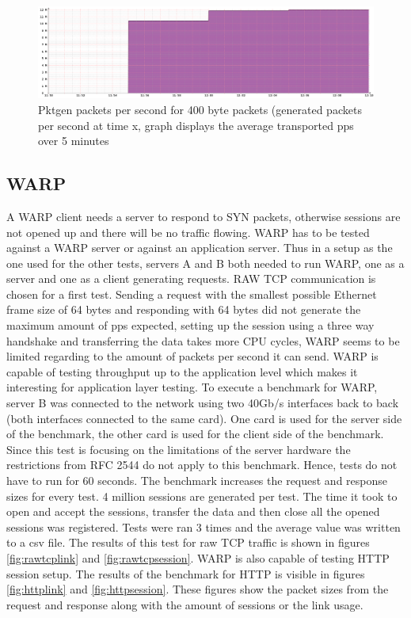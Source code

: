 \begin{figure}
  \includegraphics[scale=0.35]{images/pktgen_pps.png}
  \caption{Pktgen packets per second for 400 byte packets (generated packets per second at time x, graph displays the average transported pps over 5 minutes}
  \label{fig:pktgenpps}
\end{figure}

\newpage

\subsection{WARP}\label{sub:warp}
A WARP client needs a server to respond to SYN packets, otherwise sessions are not opened up and there will be no traffic flowing. 
WARP has to be tested against a WARP server or against an application server. 
Thus in a setup as the one used for the other tests, servers A and B both needed to run WARP, one as a server and one as a client generating requests. RAW TCP communication is chosen for a first test. 
Sending a request with the smallest possible Ethernet frame size of 64 bytes and responding with 64 bytes did not generate the maximum amount of pps expected, setting up the session using a three way handshake and transferring the data takes more CPU cycles, WARP seems to be limited regarding to the amount of packets per second it can send. WARP is capable of testing throughput up to the application level which makes it interesting for application layer testing.
To execute a benchmark for WARP, server B was connected to the network using two 40Gb/s interfaces back to back (both interfaces connected to the same card). One card is used for the server side of the benchmark, the other card is used for the client side of the benchmark. 
Since this test is focusing on the limitations of the server hardware the restrictions from RFC 2544 do not apply to this benchmark. Hence, tests do not have to run for 60 seconds.  
The benchmark increases the request and response sizes for every test. 4 million sessions are generated per test. The time it took to open and accept the sessions, transfer the data and then close all the opened sessions was registered. Tests were ran 3 times and the average value was written to a csv file. 
The results of this test for raw TCP traffic is shown in figures \ref{fig:rawtcplink} and \ref{fig:rawtcpsession}. 
WARP is also capable of testing HTTP session setup. The results of the benchmark for HTTP is visible in figures \ref{fig:httplink} and \ref{fig:httpsession}.
These figures show the packet sizes from the request and response along with the amount of sessions or the link usage.

